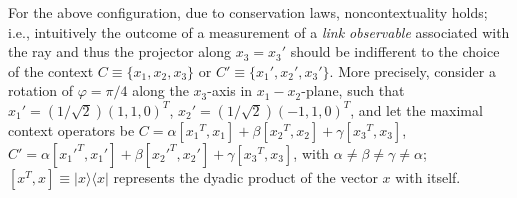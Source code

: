 For the above configuration, due to conservation laws, noncontextuality holds;
i.e., intuitively the outcome of a measurement of
a {\em link observable} associated with the ray and thus the projector along $x_3=x_3'$
should be indifferent to the choice of the context
$C \equiv \{x_1,x_2,x_3\}$ or $C' \equiv \{x_1',x_2',x_3'\}$.
More precisely, consider
 a rotation of $\varphi = \pi /4$ along the $x_3$-axis in $x_1-x_2$-plane,
such that
$ {x_1'} = (1/\sqrt{2})(1,1,0)^T$,
$ {x_2'} = (1/\sqrt{2})(-1,1,0)^T$,
and let the  maximal context operators be
$
C =
\alpha
[{x_1}^T, {x_1}]
+
\beta
[{x_2}^T, {x_2}]
+
\gamma
[{x_3}^T, {x_3}]
$,
$
C' =
\alpha
[{x_1'}^T, {x_1'}]
+
\beta
[{x_2'}^T, {x_2'}]
+
\gamma
[{x_3}^T, {x_3}]
$,
with $\alpha \neq \beta \neq \gamma \neq \alpha$;
$[x^T,x]\equiv \vert x\rangle \langle x\vert$ represents the dyadic
product of the vector $x$ with itself.

